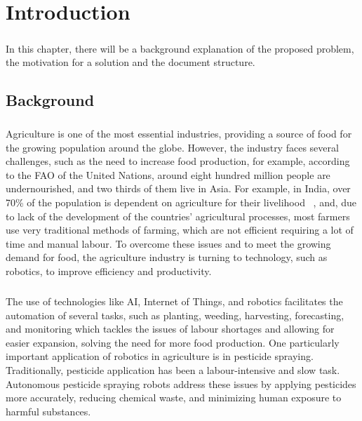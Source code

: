 
%

\chapter{Introduction}
\label{cha:introduction}
\paragraph{}In this chapter, there will be a background explanation of the proposed problem, 
the motivation for a solution and the document structure.

\section{Background}
\label{sec:background} 
\paragraph{}Agriculture is one of the most essential industries, providing a source of food for the growing population 
around the globe. However, the industry faces several challenges, such as the need to increase food production, 
for example, according to the \gls{FAO} of the United Nations, around eight hundred million 
people are undernourished, and two thirds of them live in Asia. For example, in India, over 70\% of the population 
is dependent on agriculture for their livelihood ~\cite{agriIndia}, and, due to lack of the development of 
the countries’ agricultural processes, most farmers use very traditional methods of farming, which are not efficient 
requiring a lot of time and manual labour. To overcome these issues and to meet the growing demand for food,
the agriculture industry is turning to technology, such as robotics, to improve efficiency and productivity.
\paragraph{}The use of technologies like AI, Internet of Things, and robotics facilitates the automation of 
several tasks, such as planting, weeding, harvesting, forecasting, and monitoring which tackles the issues of 
labour shortages and allowing for easier expansion, solving the need for more food production. One particularly important application of robotics in agriculture is in pesticide spraying. 
Traditionally, pesticide application has been a labour-intensive and slow task. Autonomous pesticide 
spraying robots address these issues by applying pesticides more accurately, reducing chemical waste, and 
minimizing human exposure to harmful substances. 


